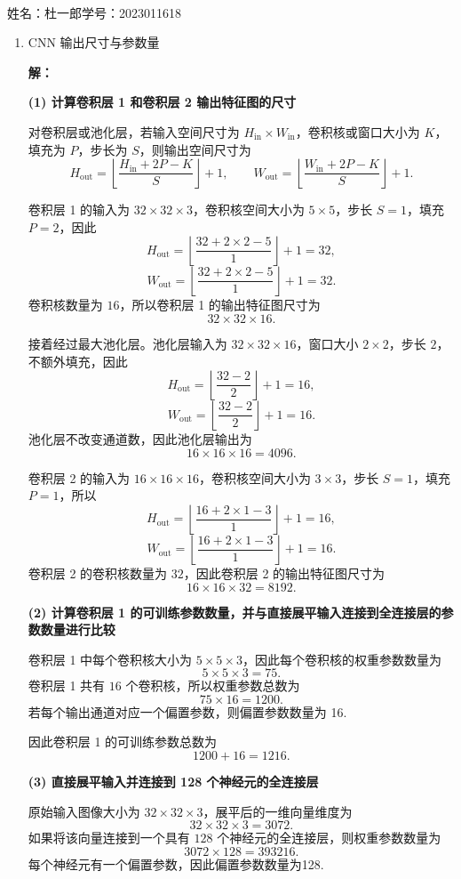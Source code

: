 \documentclass[a4paper]{article}
\makeatletter
\newcommand{\courseheader}{
        \begin{center}
            {\Large \heiti \@courseinstitute \quad \@coursename}\\[0.5em]
            {\large \@term \quad \@hwname 6 \quad \@slname}
        \end{center}
        \vspace{1em}
    }
\newcommand{\name}[1]{\noindent #1 \par\vspace{1em}}
\newenvironment{solution}{\par\noindent\textbf{解：}\par}{\par}
\makeatother
\begin{document}
\courseheader
\name{姓名：杜一郎\qquad 学号：2023011618}

\begin{enumerate}
\setlength{\itemsep}{3\parskip}

\item CNN 输出尺寸与参数量
\begin{solution}
\textbf{(1) 计算卷积层 1 和卷积层 2 输出特征图的尺寸}

对卷积层或池化层，若输入空间尺寸为 $H_{\mathrm{in}}\times W_{\mathrm{in}}$，卷积核或窗口大小为 $K$，填充为 $P$，步长为 $S$，则输出空间尺寸为
\[
H_{\mathrm{out}}
=
\left\lfloor
\frac{H_{\mathrm{in}}+2P-K}{S}
\right\rfloor+1,
\qquad
W_{\mathrm{out}}
=
\left\lfloor
\frac{W_{\mathrm{in}}+2P-K}{S}
\right\rfloor+1.
\]

卷积层 1 的输入为 $32\times 32\times 3$，卷积核空间大小为 $5\times 5$，步长 $S=1$，填充 $P=2$，因此
\[
H_{\mathrm{out}}
=
\left\lfloor
\frac{32+2\times 2-5}{1}
\right\rfloor+1
=
32,
\]
\[
W_{\mathrm{out}}
=
\left\lfloor
\frac{32+2\times 2-5}{1}
\right\rfloor+1
=
32.
\]
卷积核数量为 $16$，所以卷积层 1 的输出特征图尺寸为
\[
32\times 32\times 16.
\]

接着经过最大池化层。池化层输入为 $32\times 32\times 16$，窗口大小 $2\times 2$，步长 $2$，不额外填充，因此
\[
H_{\mathrm{out}}
=
\left\lfloor
\frac{32-2}{2}
\right\rfloor+1
=
16,
\]
\[
W_{\mathrm{out}}
=
\left\lfloor
\frac{32-2}{2}
\right\rfloor+1
=
16.
\]
池化层不改变通道数，因此池化层输出为
\[
16\times 16\times 16=4096.
\]

卷积层 2 的输入为 $16\times 16\times 16$，卷积核空间大小为 $3\times 3$，步长 $S=1$，填充 $P=1$，所以
\[
H_{\mathrm{out}}
=
\left\lfloor
\frac{16+2\times 1-3}{1}
\right\rfloor+1
=
16,
\]
\[
W_{\mathrm{out}}
=
\left\lfloor
\frac{16+2\times 1-3}{1}
\right\rfloor+1
=
16.
\]
卷积层 2 的卷积核数量为 $32$，因此卷积层 2 的输出特征图尺寸为
\[
16\times 16\times 32=8192.
\]

\textbf{(2) 计算卷积层 1 的可训练参数数量，并与直接展平输入连接到全连接层的参数数量进行比较}

卷积层 1 中每个卷积核大小为 $5\times 5\times 3$，因此每个卷积核的权重参数数量为
\[
5\times 5\times 3=75.
\]
卷积层 1 共有 $16$ 个卷积核，所以权重参数总数为
\[
75\times 16=1200.
\]
若每个输出通道对应一个偏置参数，则偏置参数数量为 16.

因此卷积层 1 的可训练参数总数为
\[
1200+16=1216.
\]

\textbf{(3) 直接展平输入并连接到 128 个神经元的全连接层}

原始输入图像大小为 $32\times 32\times 3$，展平后的一维向量维度为
\[
32\times 32\times 3=3072.
\]
如果将该向量连接到一个具有 $128$ 个神经元的全连接层，则权重参数数量为
\[
3072\times 128=393216.
\]
每个神经元有一个偏置参数，因此偏置参数数量为128.


\end{solution}
\end{enumerate}
\end{document}
